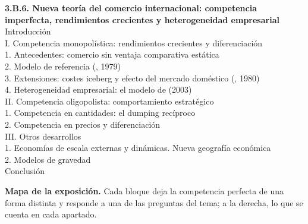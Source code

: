 \documentclass[11pt]{article}
\begin{document}
\begin{esquema}
\textbf{3.B.6. Nueva teoría del comercio internacional: competencia imperfecta, rendimientos crecientes y heterogeneidad empresarial}\\[2pt]
Introducción\\
I. Competencia monopolística: rendimientos crecientes y diferenciación\\
\hspace*{1.5em}1. Antecedentes: comercio sin ventaja comparativa estática\\
\hspace*{1.5em}2. Modelo de referencia (, 1979)\\
\hspace*{1.5em}3. Extensiones: costes iceberg y efecto del mercado doméstico (, 1980)\\
\hspace*{1.5em}4. Heterogeneidad empresarial: el modelo de  (2003)\\
II. Competencia oligopolista: comportamiento estratégico\\
\hspace*{1.5em}1. Competencia en cantidades: el dumping recíproco\\
\hspace*{1.5em}2. Competencia en precios y diferenciación\\
III. Otros desarrollos\\
\hspace*{1.5em}1. Economías de escala externas y dinámicas. Nueva geografía económica\\
\hspace*{1.5em}2. Modelos de gravedad\\
Conclusión
\end{esquema}

\begin{anotaciones}
\textbf{Mapa de la exposición.} Cada bloque deja la competencia perfecta de una forma distinta y responde a una de las preguntas del tema; a la derecha, lo que se cuenta en cada apartado.
\begin{infografiacaja}
\caption{Mapa del tema: la pregunta de cada bloque, sus apartados y el hilo que los une}\label{figu:mapa-tema}
\end{infografiacaja}
\end{anotaciones}
\end{document}
